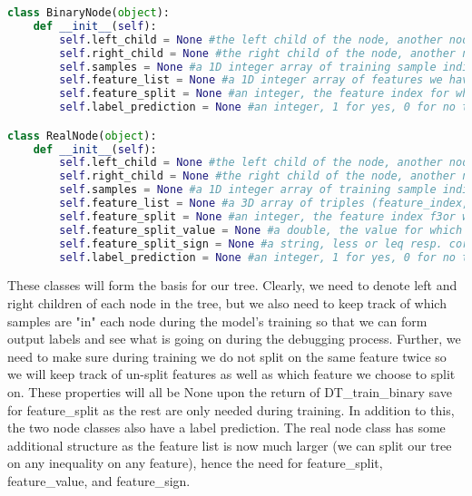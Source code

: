 \documentclass{article}
\begin{document}
\begin{lstlisting}[language=Python, caption=Python example]
    class BinaryNode(object):
    def __init__(self):
        self.left_child = None #the left child of the node, another node
        self.right_child = None #the right child of the node, another node
        self.samples = None #a 1D integer array of training sample indices "in" the node
        self.feature_list = None #a 1D integer array of features we have not yet split upon on the branch
        self.feature_split = None #an integer, the feature index for which we split on at the node
        self.label_prediction = None #an integer, 1 for yes, 0 for no the label prediction our DT will output at the particular node

class RealNode(object):
    def __init__(self):
        self.left_child = None #the left child of the node, another node
        self.right_child = None #the right child of the node, another node
        self.samples = None #a 1D integer array of training sample indices "in" the node
        self.feature_list = None #a 3D array of triples (feature_index, feature_value, feature_sign) for which we have not yet split upon on the branch
        self.feature_split = None #an integer, the feature index f3or which we split on at the node
        self.feature_split_value = None #a double, the value for which we split the feature on
        self.feature_split_sign = None #a string, less or leq resp. corresponding to either "<" or "<=", for which we split the feature value with
        self.label_prediction = None #an integer, 1 for yes, 0 for no the label prediction our DT will output at the particular node
\end{lstlisting}

    These classes will form the basis for our tree. Clearly, we need to denote
left and right children of each node in the tree, but we also need to
keep track of which samples are "in" each node during the model's training
so that we can form output labels and see what is going on during the debugging
process. Further, we need to make sure during training we do not split on
the same feature twice so we will keep track of un-split features as well
as which feature we choose to split on. These properties will all be None
upon the return of DT_train_binary save for feature_split as the rest are
only needed during training. In addition to this, the two node classes
also have a label prediction. The real node class has some additional structure
as the feature list is now much larger (we can split our tree on any inequality
on any feature), hence the need for feature_split, feature_value, and feature_sign.
\end{document}

